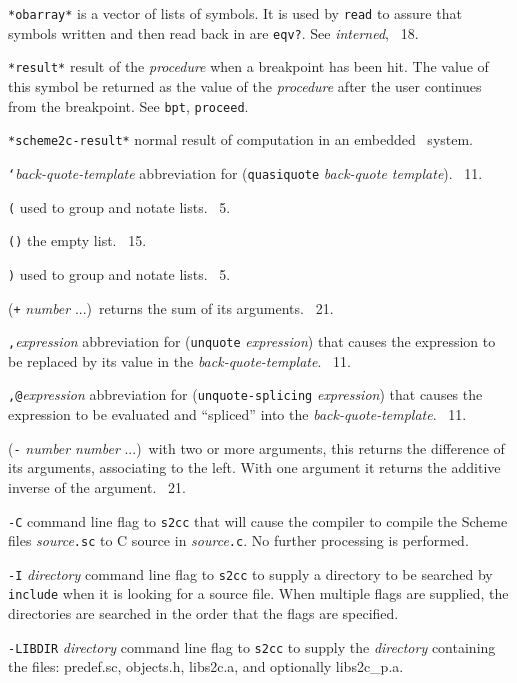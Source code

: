 \documentclass[10pt,twocolumn]{article}
\begin{document}
\texttt{*obarray*} is a vector of lists of symbols.  It is used by
\texttt{read} to assure that symbols written and then read back in are
\texttt{eqv?}.  See \emph{interned}, \RRRRRS~18.

\texttt{*result*} result of the \emph{procedure} when a breakpoint has
been hit.  The value of this symbol be returned as the value of the
\emph{procedure} after the user continues from the breakpoint.  See
\texttt{bpt}, \texttt{proceed}.

\texttt{*scheme2c-result*} normal result of computation in an embedded
\StoC\ system.

\texttt{`}\emph{back-quote-template} abbreviation for
(\texttt{quasiquote} \emph{back-quote template}). \RRRRRS~11.

\texttt{(} used to group and notate lists.  \RRRRRS~5.

\texttt{()} the empty list.  \RRRRRS~15.

\texttt{)} used to group and notate lists.  \RRRRRS~5.

(\texttt{+} \emph{number} ...)\ returns the sum of its arguments.
\RRRRRS~21.

\texttt{,}\emph{expression} abbreviation for (\texttt{unquote}
\emph{expression}) that causes the expression to be replaced by its
value in the \emph{back-quote-template}.  \RRRRRS~11.

\texttt{,@}\emph{expression} abbreviation for
(\texttt{unquote-splicing} \emph{expression}) that causes the
expression to be evaluated and ``spliced'' into the
\emph{back-quote-template}. \RRRRRS~11.

(\texttt{-} \emph{number} \emph{number} ...)\ with two or more
arguments, this returns the difference of its arguments, associating
to the left.  With one argument it returns the additive inverse of the
argument.  \RRRRRS~21.

\texttt{-C} command line flag to \texttt{s2cc} that will cause the
compiler to compile the Scheme files \emph{source}\texttt{.sc} to C
source in \emph{source}\texttt{.c}.  No further processing is
performed.

\texttt{-I} \emph{directory} command line flag to \texttt{s2cc} to
supply a directory to be searched by \texttt{include} when it is
looking for a source file.  When multiple flags are supplied, the
directories are searched in the order that the flags are specified.

\texttt{-LIBDIR} \emph{directory} command line flag to \texttt{s2cc} to
supply the \emph{directory} containing the files: predef.sc,
objects.h, libs2c.a, and optionally libs2c\_p.a.
\end{document}
